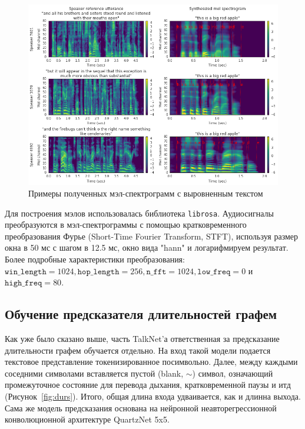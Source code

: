 \begin{figure}[!ht]
\centering
\includegraphics[width=1.0\textwidth]{images/mel-example.png}
\caption{Примеры полученных мэл-спектрограмм с выровненным текстом}
\label{fig:mel-example}
\end{figure}

Для построения мэлов использовалась библиотека \texttt{librosa}. Аудиосигналы преобразуются в мэл-спектрограммы с помощью кратковременного преобразования Фурье (Short-Time Fourier Transform, STFT), используя размер окна в 50 мс с шагом в 12.5 мс, окно вида "hann" и логарифмируем результат. Более подробные характеристики преобразования: $\texttt{win\_length}=1024, \texttt{hop\_length}=256, \texttt{n\_fft}=1024, \texttt{low\_freq}=0$ и $\texttt{high\_freq}=80$.

\subsection{Обучение предсказателя длительностей графем}

Как уже было сказано выше, часть TalkNet'а ответственная за предсказание длительности графем обучается отдельно. На вход такой модели подается текстовое представление токенизированное посимвольно. Далее, между каждыми соседними символами вставляется пустой (blank, $\sim$) символ, означающий промежуточное состояние для перевода дыхания, кратковременной паузы и итд (Рисунок~\ref{fig:durs}). Итого, общая длина входа удваивается, как и длинна выхода. Сама же модель предсказания основана на нейронной неавторегрессионной конволюционной архитектуре QuartzNet 5x5.

